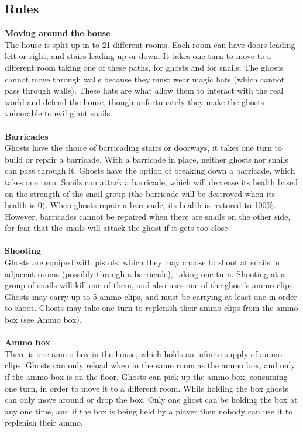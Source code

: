 \documentclass{article}
\begin{document}
\subsection{Rules}
\textbf{Moving around the house} \\ 
The house is split up in to 21 different rooms. Each room can have doors leading left or right, and stairs leading up or down. It takes one turn to move to a different room taking one of these paths, for ghosts and for snails. The ghosts cannot move through walls because they must wear magic hats (which cannot pass through walls). These hats are what allow them to interact with the real world and defend the house, though unfortunately they make the ghosts vulnerable to evil giant snails.\\ \\
\textbf{Barricades} \\
Ghosts have the choice of barricading stairs or doorways, it takes one turn to build or repair a barricade. With a barricade in place, neither ghosts nor snails can pass through it. Ghosts have the option of breaking down a barricade, which takes one turn. Snails can attack a barricade, which will decrease its health based on the strength of the snail group (the barricade will be destroyed when its health is 0). When ghosts repair a barricade, its health is restored to 100\%. However, barricades cannot be repaired when there are snails on the other side, for fear that the snails will attack the ghost if it gets too close. \\ \\
\textbf{Shooting} \\
Ghosts are equiped with pistols, which they may choose to shoot at snails in adjacent rooms (possibly through a barricade), taking one turn. Shooting at a group of snails will kill one of them, and also uses one of the ghost's ammo clips. Ghosts may carry up to 5 ammo clips, and must be carrying at least one in order to shoot. Ghosts may take one turn to replenish their ammo clips from the ammo box (see Ammo box). \\ \\
\textbf{Ammo box} \\
There is one ammo box in the house, which holds an infinite supply of ammo clips. Ghosts can only reload when in the same room as the ammo box, and only if the ammo box is on the floor. Ghosts can pick up the ammo box, consuming one turn, in order to move it to a different room. While holding the box ghosts can only move around or drop the box. Only one ghost can be holding the box at any one time, and if the box is being held by a player then nobody can use it to replenish their ammo. \\ \\
\end{document}
